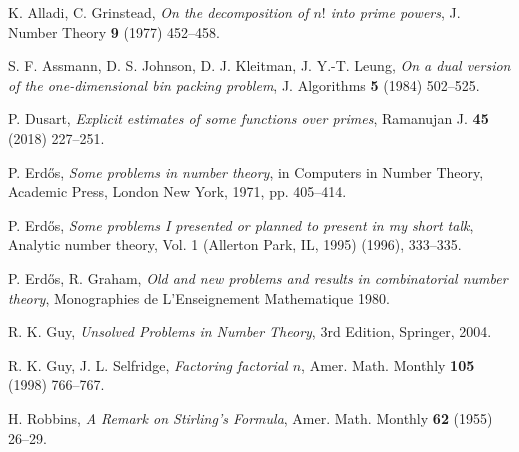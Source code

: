 \documentclass[12pt,a4paper,reqno]{amsart}
\numberwithin{equation}{section}
\theoremstyle{plain}
\theoremstyle{definition}
\begin{document}
\begin{thebibliography}{10}

K. Alladi, C. Grinstead, \emph{On the decomposition of $n!$ into prime powers}, J. Number Theory \textbf{9} (1977) 452--458.

S. F. Assmann, D. S. Johnson, D. J. Kleitman, J. Y.-T. Leung, \emph{On a dual version of the one-dimensional bin packing problem}, J. Algorithms \textbf{5} (1984) 502--525.

P. Dusart, \emph{Explicit estimates of some functions over primes}, Ramanujan J. \textbf{45} (2018) 227--251.

P. Erd\H{o}s, \emph{Some problems in number theory}, in Computers in Number Theory, Academic Press, London New York, 1971, pp. 405--414.

P. Erd\H{o}s, \emph{Some problems I presented or planned to present in my short talk}, Analytic number theory, Vol. 1 (Allerton Park, IL, 1995) (1996), 333--335.

P. Erd\H{o}s, R. Graham, \emph{Old and new problems and results in combinatorial number theory}, Monographies de L'Enseignement Mathematique 1980.

R. K. Guy, \emph{Unsolved Problems in Number Theory}, 3rd Edition, Springer, 2004.

R. K. Guy, J. L. Selfridge, \emph{Factoring factorial $n$}, Amer. Math. Monthly \textbf{105} (1998) 766--767.

H. Robbins, \emph{A Remark on Stirling's Formula}, Amer. Math. Monthly \textbf{62} (1955) 26--29.

\end{thebibliography}
\end{document}
